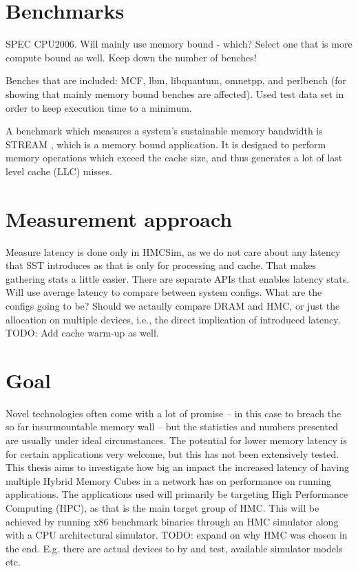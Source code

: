 
\section{Benchmarks}
SPEC CPU2006. Will mainly use memory bound - which? Select one that is more compute bound as well. Keep down the number of benches!
\bigskip

Benches that are included:
MCF, lbm, libquantum, omnetpp, and perlbench (for showing that mainly memory bound benches are affected). Used test data set in order to keep execution time to a minimum.

A benchmark which measures a system's sustainable memory bandwidth is STREAM \cite{mccalpin1995memory}, which is a memory bound application. It is designed to perform memory operations which exceed the cache size, and thus generates a lot of last level cache (LLC) misses.


\section{Measurement approach}
Measure latency is done only in HMCSim, as we do not care about any latency that SST introduces as that is only for processing and cache. That makes gathering stats a little easier. There are separate APIs that enables latency stats. Will use average latency to compare between system configs. What are the configs going to be? Should we actaully compare DRAM and HMC, or just the allocation on multiple devices, i.e., the direct implication of introduced latency. TODO: Add cache warm-up as well.

\section{Goal}
Novel technologies often come with a lot of promise -- in this case to breach the so far insurmountable memory wall -- but the statistics and numbers presented are usually under ideal circumstances. The potential for lower memory latency is for certain applications very welcome, but this has not been extensively tested. This thesis aims to investigate how big an impact the increased latency of having multiple Hybrid Memory Cubes in a network has on performance on running applications. The applications used will primarily be targeting High Performance Computing (HPC), as that is the main target group of HMC. This will be achieved by running x86 benchmark binaries through an HMC simulator along with a CPU architectural simulator. TODO: expand on why HMC was chosen in the end. E.g. there are actual devices to by and test, available simulator models etc. 


